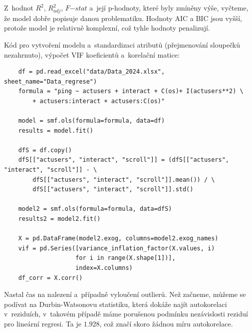 \documentclass[a4paper, 11pt]{article}
\begin{document}
Z~hodnot $R^2$, $R^2_{adj}$, $F\mathord{-}stat$ a~její p-hodnoty, které byly zmíněny výše, vyčteme, že model dobře popisuje danou problematiku.
Hodnoty AIC a BIC jsou vyšší, protože model je relativně komplexní, což tyhle hodnoty penalizují.

Kód pro vytvoření modelu a~standardizaci atributů (přejmenování sloupečků nezahrnuto), výpočet VIF koeficientů a~korelační matice:

\begin{verbatim}
    df = pd.read_excel("data/Data_2024.xlsx", sheet_name="Data_regrese")
    formula = "ping ~ actusers + interact + C(os)+ I(actusers**2) \
        + actusers:interact + actusers:C(os)"

    model = smf.ols(formula=formula, data=df)
    results = model.fit()

    dfS = df.copy()
    dfS[["actusers", "interact", "scroll"]] = (dfS[["actusers", "interact", "scroll"]] - \ 
        dfS[["actusers", "interact", "scroll"]].mean()) / \ 
        dfS[["actusers", "interact", "scroll"]].std()

    model2 = smf.ols(formula=formula, data=dfS)
    results2 = model2.fit()

    X = pd.DataFrame(model2.exog, columns=model2.exog_names)
    vif = pd.Series([variance_inflation_factor(X.values, i)
                    for i in range(X.shape[1])],
                    index=X.columns)
    df_corr = X.corr()
\end{verbatim}

Nastal čas na nalezení a~případně vyloučení outlierů.
Než začneme, můžeme se podívat na Durbin-Watsonovu statistiku, která dokáže najít autokorelaci v~reziduích, v~takovém případě máme porušenou podmínku nezávislosti reziduí pro lineární regresi.
Ta je $1.928$, což značí skoro žádnou míru autokorelace.
\end{document}
